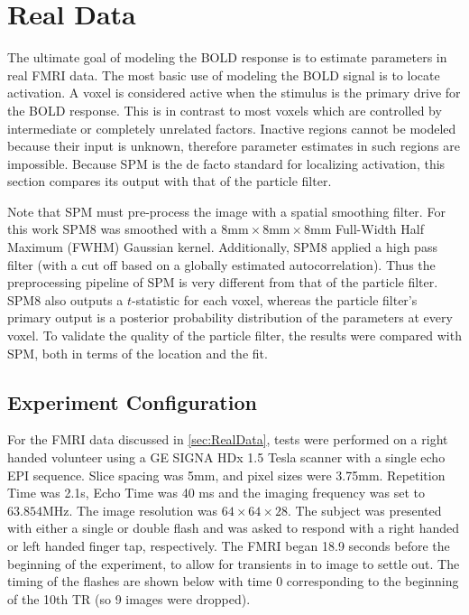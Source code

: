 \chapter{Real Data}
\label{sec:RealData}
The ultimate goal of modeling the BOLD response is to estimate parameters
in real FMRI data. The most basic use of modeling the BOLD signal is to
locate activation. A voxel is considered active when the stimulus
is the primary drive for the BOLD response. This is in contrast to
most voxels which are controlled by intermediate or completely unrelated factors.
Inactive regions cannot be modeled because their input is unknown, therefore
parameter estimates in such regions are impossible.
Because SPM is the de facto standard for localizing activation,
this section compares its output with that of the particle filter.

Note that SPM must pre-process the image with a spatial smoothing
filter. For this work SPM8 was smoothed with a
$8\text{mm} \times  8\text{mm} \times 8\text{mm}$ Full-Width Half Maximum
(FWHM) Gaussian kernel.
Additionally, SPM8 applied a high pass filter (with a cut
off based on a globally estimated autocorrelation). Thus the preprocessing pipeline
of SPM is very different from that of the particle filter. SPM8 also outputs
a $t$-statistic for each voxel, whereas the
particle filter's primary output is a posterior probability distribution of the parameters
at every voxel. To validate the quality of the particle filter, the results
were compared with SPM, both in terms of the location and the fit.

\section{Experiment Configuration}
\label{sec:ExperimentConfig}
For the FMRI data discussed in \autoref{sec:RealData}, tests were
performed on a right handed volunteer using a GE SIGNA HDx 1.5 Tesla
scanner with a single echo EPI sequence. Slice spacing was
5mm, and pixel sizes were 3.75mm.  Repetition Time was 2.1s,
Echo Time was 40 ms and the imaging frequency was set to $63.854$MHz.
The image resolution was $64 \times 64 \times 28$.
The subject was presented with either a single or
double flash and was asked to respond with a right handed
or left handed finger tap, respectively. The FMRI began 18.9 seconds
before the beginning of the experiment, to allow for transients
in to image to settle out. The timing of the flashes are shown
below with time 0 corresponding to the beginning of
the 10th TR (so 9 images were dropped).


